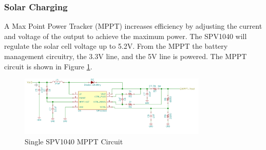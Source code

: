 \documentclass{article}
\numberwithin{figure}{section}
\numberwithin{equation}{section}
\begin{document}
{\subsubsection{Solar Charging}

A Max Point Power Tracker (MPPT) increases efficiency by adjusting the current and voltage of the output to achieve the maximum power. The SPV1040 will regulate the solar cell voltage up to 5.2V. From the MPPT the battery management circuitry, the 3.3V line, and the 5V line is powered. The MPPT circuit is shown in Figure \ref{fig:singlemppt}.

\begin{figure}[H]
	\centering
	\includegraphics[width=0.8\textwidth]{singlempptcircuit}
	\caption{Single SPV1040 MPPT Circuit}
	\label{fig:singlemppt}
\end{figure}

}
\end{document}
